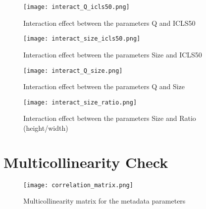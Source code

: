 \documentclass[12pt]{article}
\begin{document}
\begin{figure}[h]
	\begin{center}
		\texttt{[image: interact\_Q\_icls50.png]}
	\end{center}
	\caption{Interaction effect between the parameters Q and ICLS50}
	\label{fig:interact_Q_icls50}
\end{figure}

\begin{figure}[h]
	\begin{center}
		\texttt{[image: interact\_size\_icls50.png]}
	\end{center}
	\caption{Interaction effect between the parameters Size and ICLS50 }
	\label{fig:interact_size_icls50}
\end{figure}

\begin{figure}[h]
	\begin{center}
		\texttt{[image: interact\_Q\_size.png]}
	\end{center}
	\caption{Interaction effect between the parameters Q and Size}
	\label{fig:interact_Q_size}
\end{figure}

\begin{figure}[h]
	\begin{center}
		\texttt{[image: interact\_size\_ratio.png]}
	\end{center}
	\caption{Interaction effect between the parameters Size and Ratio (height/width)}
	\label{fig:interact_size_ratio}
\end{figure}

\clearpage
\section{Multicollinearity Check}\label{Amulticol}

\begin{sidewaysfigure}[h]
    \centering
	\begin{center}
		\texttt{[image: correlation\_matrix.png]}
	\end{center}
	\caption{Multicollinearity matrix for the metadata parameters}
	\label{fig:multicol}
\end{sidewaysfigure}
\end{document}

